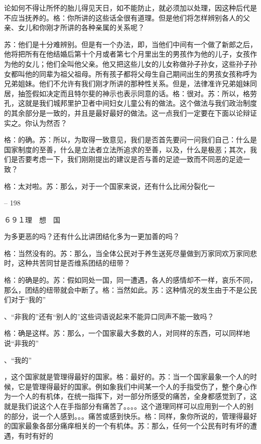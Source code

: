 \documentclass[11pt,oneside]{book}
\begin{document}
\begin{common-format}
    论如何不得让所怀的胎儿得见天日，如不能防止，就必须加以处理，因这种后代是不应当抚养的。格：你所讲的这些话全很有道理。但是他们将怎样辨别各人的父亲、女儿和你刚才所讲的各种亲属的关系呢？

    苏：他们是十分难辨别。但是有一个办法，即，当他们中间有一个做了新郎之后，他将把所有在他结婚后第十个月或者第七个月里出生的男孩作为他的儿子，女孩作为他的女儿；他们全叫他父亲。他又把这些儿女的儿女称做孙子孙女，这些孙子孙女都叫他的同辈为祖父祖母。所有孩子都将父母生自己期间出生的男孩女孩称呼为兄弟姐妹。他们不允许有我们刚才所讲的那种性关系。但是，法律准许兄弟姐妹同居，抽签假如决定而且特尔斐的神示也表示同意的话。格：很对。苏：所以，格劳孔，这就是我们城邦里护卫者中间妇女儿童公有的做法。这个做法与我们政治制度的其余部分是一致的，并且是最好最好的做法。这一点我们一定要在下面以论辩证实之。你认为然否？

    格：的确。苏：所以，为取得一致意见，我们是否首先要问一问我们自己：什么是国家制度的至善，什么是立法者立法所追求的至善，以及，什么是极恶；其次，我们是否要考虑一下，我们刚刚提出的建议是否与善的足迹一致而不同恶的足迹一致？

    格：太对啦。苏：那么，对于一个国家来说，还有什么比闹分裂化一

    

-- 198

    ６９１理　想　国

    为多更恶的吗？还有什么比讲团结化多为一更加善的吗？

    格：当然没有的。苏：那么，当全体公民对于养生送死尽量做到万家同欢万家同悲时，这种共苦同甘是否维系团结的纽带？

    格：的确是的。苏：假如同处一国，同一遭遇，各人的感情却不一样，哀乐不同，那么，团结的纽带就会中断了。格：当然如此。苏：这种情况的发生由于不是公民们对于“我的”

    、“非我的”还有“别人的”这些词语说起来不能异口同声不能一致吗？

    格：确是这样。苏：那么，一个国家最大多数的人，对同样的东西，可以同样地说“非我的”

    、“我的”

    ，这个国家就是管理得最好的国家。格：最好的。苏：当一个国家最象一个人的时候，它是管理得最好的国家。例如象我们中间某一个人的手指受伤了，整个身心作为一个人的有机体，在统一指挥下，对一部分所感受的痛苦，全身都感觉到了，这就是我们说这个人在手指部分有痛苦了。。。。这个道理同样可以应用到一个人的别的部分，说一个人感到。。。痛苦或感到快乐。格：同样，象你所说的，管理得最好的国家最象各部分痛痒相关的一个有机体。苏：那么，任何一个公民有时有坏的遭遇，有时有好的


\end{common-format}
\end{document}
